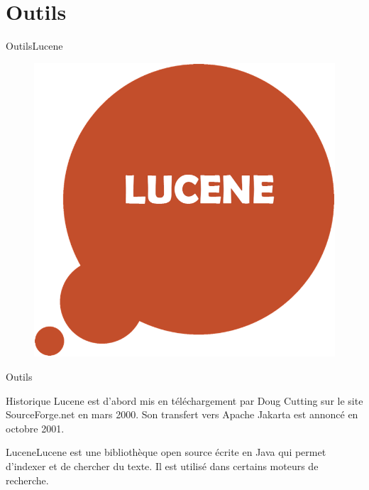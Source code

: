 \documentclass[10pt]{beamer}
\begin{document}
\section{Outils}

\begin{frame}{Outils}{Lucene}
\begin{figure}[t]
    \centering
    \includegraphics[height=\dimexpr10\textheight/16\relax]{lucene}
   
  \end{figure}
\end{frame}
\begin{frame}{Outils}

\begin{block}{Historique}
Lucene est d'abord mis en téléchargement par Doug Cutting sur le site SourceForge.net en mars 2000. Son transfert vers Apache Jakarta est annoncé en octobre 2001.
\end{block}

\begin{block}{Lucene}Lucene est une bibliothèque open source écrite en Java qui permet d'indexer et de chercher du texte. Il est utilisé dans certains moteurs de recherche.
\end{block}
\end{frame}
\end{document}
